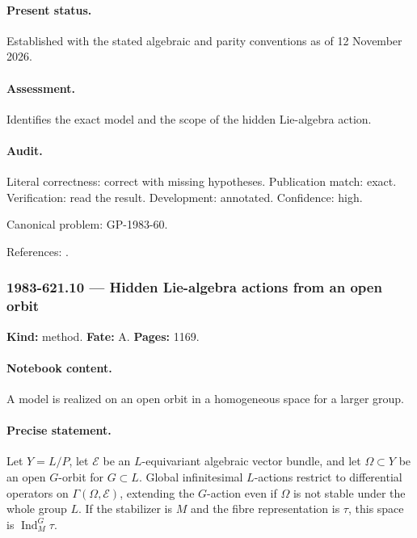 \paragraph{Present status.} Established with the stated algebraic and parity conventions as of 12 November 2026.

\paragraph{Assessment.} Identifies the exact model and the scope of the hidden Lie-algebra action.

\paragraph{Audit.} Literal correctness: correct with missing hypotheses. Publication match: exact. Verification: read the result. Development: annotated. Confidence: high.

\noindent Canonical problem: GP-1983-60.\par

\noindent References: \citep{gelfandzelevinsky1984models}.\par

\subsubsection{1983-621.10 --- Hidden Lie-algebra actions from an open orbit}

\label{item:1983-621.10}

\noindent\textbf{Kind:} method. \textbf{Fate:} A. \textbf{Pages:} 1169.\par

\paragraph{Notebook content.} A model is realized on an open orbit in a homogeneous space for a larger group.

\paragraph{Precise statement.} Let \(Y=L/P\), let \(\mathcal E\) be an \(L\)-equivariant algebraic vector bundle, and let \(\Omega\subset Y\) be an open \(G\)-orbit for \(G\subset L\). Global infinitesimal \(L\)-actions restrict to differential operators on \(\Gamma(\Omega,\mathcal E)\), extending the \(G\)-action even if \(\Omega\) is not stable under the whole group \(L\). If the stabilizer is \(M\) and the fibre representation is \(\tau\), this space is \(\operatorname{Ind}_M^G\tau\).

